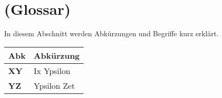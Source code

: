 %
%

\section{(Glossar)}\label{sec.glossar}
\label{cha:abkürzungsverzeichnis}

In diesem Abschnitt werden Abkürzungen und Begriffe kurz erklärt.

\begin{longtable}{|m{3cm}|m{11cm}|}\hline	
	\rowcolor{gray} \textbf{Abk}&
	Abkürzung \\ \hline	

	\textbf{XY}&
	Ix Ypsilon \\ \hline	
	
	\textbf{YZ}&
	Ypsilon Zet \\ \hline
	
	
	
	
	
\end{longtable}
